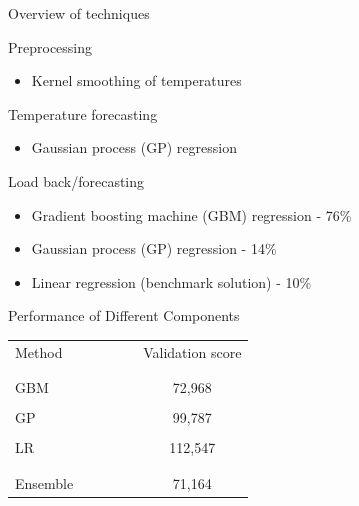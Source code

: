 \begin{frame}{Overview of techniques}
  \begin{block}{Preprocessing}
    \begin{itemize}
      \item Kernel smoothing of temperatures
    \end{itemize}
  \end{block}
  \vspace{\baselineskip}
  \begin{block}{Temperature forecasting}
    \begin{itemize}
      \item Gaussian process (GP) regression
    \end{itemize}
  \end{block}
  \vspace{\baselineskip}
  \begin{block}{Load back/forecasting}
    \begin{itemize}
      \item Gradient boosting machine (GBM) regression  - 76\%
      \item Gaussian process (GP) regression - 14\%
      \item Linear regression (benchmark solution) - 10\%
    \end{itemize}
  \end{block}
\end{frame}

\begin{frame}{Performance of Different Components}
  \begin{center}
    \begin{tabular}{lcc|ccc}
      Method &&&&& Validation score\\&&&&&\\
      \hline&&&&&\\
      GBM &&&&& 72,968 \\&&&&&\\
      GP &&&&& 99,787 \\&&&&&\\
      LR &&&&& 112,547 \\&&&&&\\
      \hline&&&&&\\
      Ensemble &&&&& 71,164
    \end{tabular}
  \end{center}
\end{frame}

